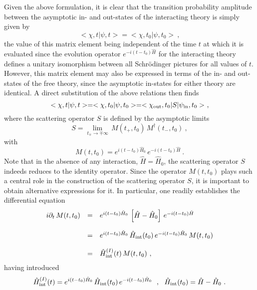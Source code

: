 \documentclass[a4paper,11pt]{article}
\begin{document}
Given the above formulation, it is clear that the transition probability
amplitude between the asymptotic in- and out-states of the interacting
theory is simply given by
\begin{equation}
<\chi,t|\psi,t>=<\chi,t_0|\psi,t_0>\ ,
\end{equation}
the value of this matrix element being independent of the time $t$ at which 
it is evaluated since the evolution operator $e^{-i(t-t_0)\hat{H}}$ for the
interacting theory defines a unitary isomorphism between all Schr\"odinger 
pictures for all values of $t$. However, this matrix element may also be 
expressed in terms of the in- and out-states of the free theory, since the 
asymptotic in-states for either theory are identical. A direct substitution 
of the above relations then finds
\begin{equation}
<\chi,t|\psi,t>=<\chi,t_0|\psi,t_0>=<\chi_{\rm out},t_0|S|\psi_{\rm in},t_0>\ ,
\label{eq:Svalue}
\end{equation}
where the scattering operator $S$ is defined by the asymptotic limits
\begin{equation}
S=\lim_{t_\mp\rightarrow\mp\infty}\,M(t_+,t_0)\,M^\dagger(t_-,t_0)\ ,
\end{equation}
with
\begin{equation}
M(t,t_0)=e^{i(t-t_0)\hat{H}_0}\,e^{-i(t-t_0)\hat{H}}\ .
\end{equation}
Note that in the absence of any interaction, $\hat{H}=\hat{H}_0$,
the scattering operator $S$ indeeds reduces to the identity operator.
Since the operator $M(t,t_0)$ plays such a central role in the construction
of the scattering operator $S$, it is important to obtain alternative
expressions for it. In particular, one readily establishes
the differential equation
\begin{equation}
\begin{array}{r c l}
i\partial_t\,M(t,t_0)&=&e^{i(t-t_0)\hat{H}_0}\,\left[\hat{H}-\hat{H}_0\right]\,
e^{-i(t-t_0)\hat{H}}\\
 & & \\
&=&e^{i(t-t_0)\hat{H}_0}\,\hat{H}_{\rm int}(t_0)\,e^{-i(t-t_0)\hat{H}_0}\,
M(t,t_0)\\
 & & \\
&=&\hat{H}^{(I)}_{\rm int}(t)\,M(t,t_0)\ ,
\end{array}
\label{eq:Moller}
\end{equation}
having introduced
\begin{equation}
\hat{H}^{(I)}_{\rm int}(t)=e^{i(t-t_0)\hat{H}_0}\,\hat{H}_{\rm int}(t_0)\,
e^{-i(t-t_0)\hat{H}_0}\ \ ,\ \ \hat{H}_{\rm int}(t_0)=\hat{H}-\hat{H}_0\ .
\end{equation}
\end{document}
